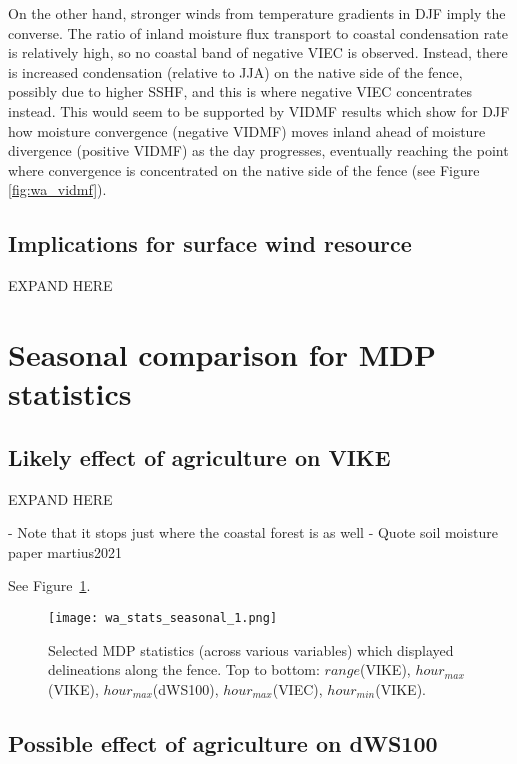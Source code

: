 On the other hand, stronger winds from temperature gradients in \ac{DJF} imply the converse. The ratio of inland moisture flux transport to coastal condensation rate is relatively high, so no coastal band of negative \ac{VIEC} is observed. Instead, there is increased condensation (relative to \ac{JJA}) on the native side of the fence, possibly due to higher \ac{SSHF}, and this is where negative \ac{VIEC} concentrates instead. This would seem to be supported by \ac{VIDMF} results which show for \ac{DJF} how moisture convergence (negative \ac{VIDMF}) moves inland ahead of moisture divergence (positive \ac{VIDMF}) as the day progresses, eventually reaching the point where convergence is concentrated on the native side of the fence (see Figure \ref{fig:wa_vidmf}).

\subsection{Implications for surface wind resource} 

EXPAND HERE

\section{Seasonal comparison for MDP statistics}

\subsection{Likely effect of agriculture on VIKE}

EXPAND HERE

- Note that it stops just where the coastal forest is as well
- Quote soil moisture paper martius2021

See Figure~\ref{fig:wa_stats_seasonal_1}.

\begin{figure}[!htp]
	\centering
	\texttt{[image: wa\_stats\_seasonal\_1.png]}
	\caption[Selected MDP statistics with fence delineations]{Selected \ac{MDP} statistics (across various variables) which displayed delineations along the fence. Top to bottom: $range$(\acs{VIKE}), $hour_{max}$(\acs{VIKE}), $hour_{max}$(\acs{dWS100}), $hour_{max}$(\acs{VIEC}), $hour_{min}$(\acs{VIKE}).}
	\label{fig:wa_stats_seasonal_1}
\end{figure}

\subsection{Possible effect of agriculture on dWS100}

